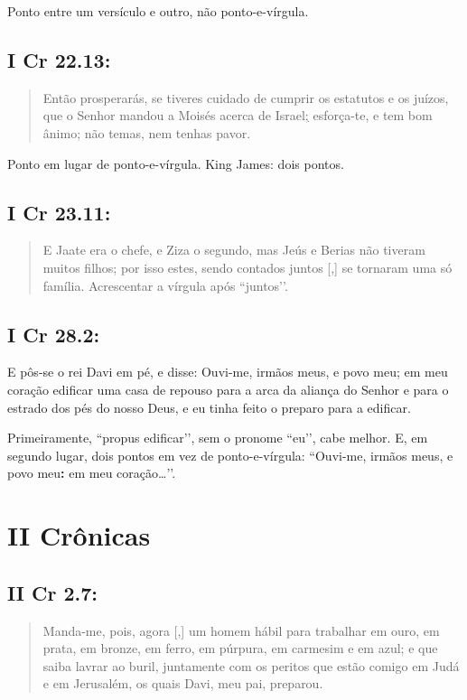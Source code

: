 Ponto entre um versículo e outro, não ponto-e-vírgula.

\subsection{I Cr 22.13:}
\begin{quote}
    \small
 Então prosperarás, se tiveres cuidado de cumprir os estatutos e os juízos, que o Senhor mandou a Moisés acerca de Israel\uline{;} esforça-te, e tem bom ânimo; não temas, nem tenhas pavor.
\end{quote}
 
Ponto em lugar de ponto-e-vírgula. King James: dois pontos.

\subsection{I Cr 23.11:}
\begin{quote}
    \small
 E Jaate era o chefe, e Ziza o segundo, mas Jeús e Berias não tiveram muitos filhos; por isso estes, sendo contados juntos [,] se tornaram uma só família.
Acrescentar a vírgula após ``juntos’’.
\end{quote}

\subsection{I Cr 28.2:}

 E pôs-se o rei Davi em pé, e disse: Ouvi-me, irmãos meus, e povo meu\uline{;} em meu coração  edificar uma casa de repouso para a arca da aliança do Senhor e para o estrado dos pés do nosso Deus, e eu tinha feito o preparo para a edificar.
 
Primeiramente, ``propus edificar’’, sem o pronome ``eu’’, cabe
melhor. E, em segundo lugar, dois pontos em vez de ponto-e-vírgula: ``Ouvi-me,
irmãos meus, e povo meu\textbf{:} em meu coração\ldots’’.

\section{II Crônicas}
\subsection{II Cr 2.7:}
\begin{quote}
    \small
 Manda-me, pois, agora [,] um homem hábil para trabalhar em ouro, em prata, em bronze, em ferro, em púrpura, em carmesim e em azul; e que saiba lavrar ao buril, juntamente com os peritos que estão comigo em Judá e em Jerusalém, os quais Davi, meu pai, preparou.
 \end{quote}
 
